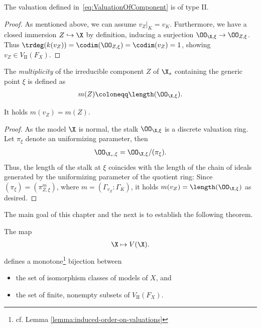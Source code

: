 \begin{proposition}\label{prop:WellDefOfInducedValuation}
    The valuation defined in~\eqref{eq:ValuationOfComponent} is of type \textrm{II}.
\end{proposition}

\begin{proof}
    As mentioned above, we can assume $v_Z|_K = v_K$.
    Furthermore, we have a closed immersion $Z \hookrightarrow \X$
    by definition, inducing a surjection $\OO_{\X,\xi} \to \OO_{Z,\xi}$.
    Thus $\trdeg(k(v_Z)) = \codim(\OO_{Z,\xi}) = \codim(v_Z) = 1$, showing $v_Z \in V_\textrm{II}(F_X)$.
\end{proof}

\begin{definition}
    The \textit{multiplicity} of the irreducible component $Z$ of $\X_s$ containing the generic point $\xi$ is defined as
    \begin{align}
        m(Z) \coloneqq \length(\OO_{\X,\xi}).
    \end{align}
\end{definition}

\begin{proposition}\label{prop:multiplicities-coincide}
    It holds $m(v_Z) = m(Z)$.
\end{proposition}

\begin{proof}
    As the model $\X$ is normal, the stalk $\OO_{\X, \xi}$ is a discrete valuation ring\@.
    Let $\pi_\xi$ denote an uniformizing parameter, then
    \begin{align}
        \OO_{\X_s,\xi} = \OO_{\X,\xi}/(\pi_\xi).
    \end{align}
    Thus, the length of the stalk at $\xi$ coincides with the length of the chain of ideals generated
    by the uniformizing parameter of the quotient ring:
    Since $(\pi_\xi) = (\pi_{Z,\xi}^m)$, where $m = (\Gamma_{v_Z}:\Gamma_K)$, it holds $m(v_Z) = \length(\OO_{\X, \xi})$ as desired.
\end{proof}

The main goal of this chapter and the next is to establish the following theorem.

\begin{theorem}\label{thm:bijectionModelsAndComponents}
    The map
    \begin{align} \label{eq:mapFromModelToValuation}
        \X \mapsto V(\X).
    \end{align}
    defines a monotone\footnote{cf. Lemma \ref{lemma:induced-order-on-valuations}} bijection between
    \begin{itemize}
        \item the set of isomorphism classes of models of $X$, and
        \item the set of finite, nonempty subsets of $V_\textrm{II}(F_X)$.
    \end{itemize}
\end{theorem}

